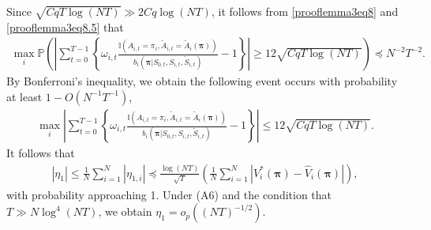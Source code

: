 \documentclass{article}
\newcommand{\prob}{{\mathbb{P}}}
\begin{document}
Since $\sqrt{CqT\log (NT)}\gg 2Cq\log(NT)$, it follows from \eqref{prooflemma3eq8} and \eqref{prooflemma3eq8.5} that 
\begin{eqnarray*}
	\max_i \prob\left(\left|\sum_{t=0}^{T-1} \left\{\omega_{i,t}\frac{\mathbb{I}(A_{i,t}=\pi_i,\widetilde{A}_{i,t}=\widetilde{A}_i(\bm{\pi}))}{b_i(\bm{\pi}|S_{0,t},S_{i,t},\widetilde{S}_{i,t})}-1\right\} \right|\ge 12\sqrt{CqT\log (NT)} \right)\preceq N^{-2}T^{-2}. 
\end{eqnarray*}
By Bonferroni's inequality, we obtain the following event occurs with probability at least $1-O(N^{-1} T^{-1})$,
\begin{eqnarray*}
	\max_i \left|\sum_{t=0}^{T-1} \left\{\omega_{i,t}\frac{\mathbb{I}(A_{i,t}=\pi_i,\widetilde{A}_{i,t}=\widetilde{A}_i(\bm{\pi}))}{b_i(\bm{\pi}|S_{0,t},S_{i,t},\widetilde{S}_{i,t})}-1\right\} \right|\le 12\sqrt{CqT\log (NT)}.
\end{eqnarray*}
It follows that
\begin{eqnarray}\label{eqn:eta1}
	|\eta_1|\le \frac{1}{N}\sum_{i=1}^N |\eta_{1,i}|\preceq \frac{\log (NT)}{\sqrt{T}} \left(\frac{1}{N}\sum_{i=1}^N |V_i^*(\bm{\pi})-\widehat{V}_i(\bm{\pi})|\right),
\end{eqnarray}
with probability approaching 1. Under (A6) and the condition that $T\gg N\log^4 (NT)$, we obtain $\eta_1=o_p((NT)^{-1/2})$. 
\end{document}
